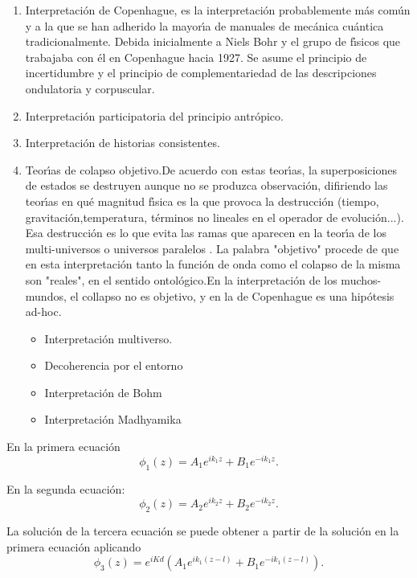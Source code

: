 \begin{enumerate}
\item Interpretaci\'{o}n de Copenhague, es la interpretaci\'{o}n probablemente m\'{a}s com\'{u}n y a la
  que se han adherido la mayor\'{\i}a de manuales de mec\'{a}nica cu\'{a}ntica tradicionalmente. Debida
  inicialmente a Niels Bohr y el grupo de f\'{\i}sicos que trabajaba con \'{e}l en Copenhague hacia
  1927. Se asume el principio de incertidumbre y el principio de complementariedad de las
  descripciones ondulatoria y corpuscular.
\item Interpretaci\'{o}n participatoria del principio antr\'{o}pico.
\item Interpretaci\'{o}n de historias consistentes.
\item Teor\'{\i}as de colapso objetivo.De acuerdo con estas teor\'{\i}as, la superposiciones de
  estados se destruyen aunque no se produzca observaci\'{o}n, difiriendo las teor\'{\i}as en qu\'{e}
  magnitud f\'{\i}sica es la que provoca la destrucci\'{o}n (tiempo, gravitaci\'{o}n,temperatura,
  t\'{e}rminos no lineales en el operador de evoluci\'{o}n...). Esa destrucci\'{o}n es lo que evita
  las ramas que aparecen en la teor\'{\i}a de los multi-universos o universos paralelos . La
  palabra "objetivo" procede de que en esta interpretaci\'{o}n tanto la funci\'{o}n de onda como
  el colapso de la misma son "reales", en el sentido ontol\'{o}gico.En la interpretaci\'{o}n de
  los muchos-mundos, el collapso no es objetivo, y en la de Copenhague es una hip\'{o}tesis
  ad-hoc.

  \begin{itemize}
  \item Interpretaci\'{o}n multiverso.
  \item Decoherencia por el entorno
  \item Interpretaci\'{o}n de Bohm
  \item Interpretaci\'{o}n Madhyamika
  \end{itemize}
\end{enumerate}

En la primera ecuaci\'{o}n
\begin{equation}
\phi_{1}(z)=A_{1}e^{ik_{1}z}+B_{1}e^{-ik_{1}z}.
\end{equation}

En la segunda ecuaci\'{o}n:
\begin{equation}
\phi_{2}(z)=A_{2}e^{ik_{2}z}+B_{2}e^{-ik_{2}z}.
\end{equation}

La soluci\'{o}n de la tercera ecuaci\'{o}n se puede obtener a partir de la
soluci\'{o}n en la primera ecuaci\'{o}n aplicando \cite{Laricch2009AAMOP_ICBp3}
\begin{equation}
\phi_{3}(z)=e^{iKd}(A_{1}e^{ik_{1}(z-l)}+B_{1}e^{-ik_{1}(z-l)}).
\end{equation}


